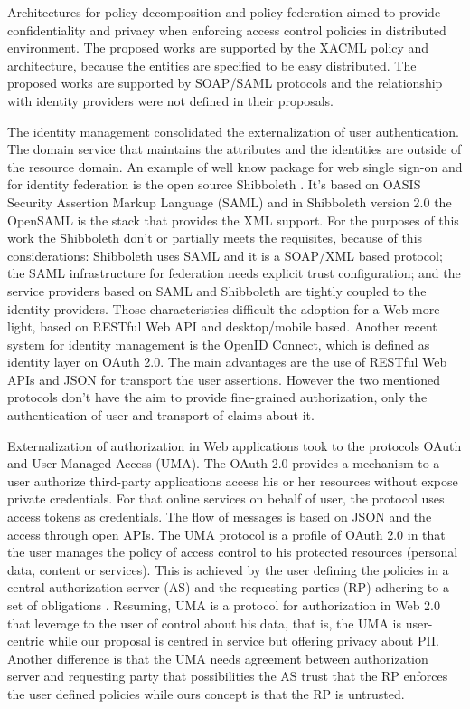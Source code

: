 \documentclass{doublecol-new}
\begin{document}
Architectures for policy decomposition \cite{lin2008policy} and policy federation \cite{decat2012toward,decat2013federated,decat2014middleware} aimed to provide confidentiality and privacy when enforcing access control policies in distributed environment. The proposed works are supported by the XACML policy and architecture, because the entities are specified to be easy distributed. The proposed works are supported by SOAP/SAML protocols and the relationship with identity providers were not defined in their proposals. 

The identity management consolidated the externalization of user authentication. The domain service that maintains the attributes and the identities are outside of the resource domain. An example of well know package for web single sign-on and for identity federation is the open source Shibboleth \citep{erdos2002shibboleth}. It's based on OASIS Security Assertion Markup Language (SAML) and in Shibboleth version 2.0 the OpenSAML is the stack that provides the XML support. For the purposes of this work the Shibboleth don't or partially meets the requisites, because of this considerations: Shibboleth uses SAML and it is a SOAP/XML based protocol; the SAML infrastructure for federation needs explicit trust configuration; and the service providers based on SAML and Shibboleth are tightly coupled to the identity providers. Those characteristics difficult the adoption for a Web more light, based on RESTful Web API and desktop/mobile based. Another recent system for identity management is the OpenID Connect, which is defined as identity layer on OAuth 2.0. The main advantages are the use of RESTful Web APIs and JSON for transport the user assertions. However the two mentioned protocols don't have the aim to provide fine-grained authorization, only the authentication of user and transport of claims about it.

Externalization of authorization in Web applications took to the protocols OAuth and User-Managed Access (UMA)\citep{hardjono-oauth-umacore-14,machulak2010user}. The OAuth 2.0 provides a mechanism to a user authorize third-party applications access his or her resources without expose private credentials. For that online services on behalf of user, the protocol uses access tokens as credentials. The flow of messages is based on JSON and the access through open APIs. The UMA protocol is a profile of OAuth 2.0 in that the user manages the policy of access control to his protected resources (personal data, content or services). This is achieved by the user defining the policies in a central authorization server (AS) and the requesting parties (RP) adhering to a set of obligations \citep{maler-oauth-umatrust-03}. Resuming, UMA is a protocol for authorization in Web 2.0 that leverage to the user of control about his data, that is, the UMA is user-centric while our proposal is centred in service but offering privacy about PII. Another difference is that the UMA needs agreement between authorization server and requesting party that possibilities the AS trust that the RP enforces the user defined policies while ours concept is that the RP is untrusted.
\end{document}
